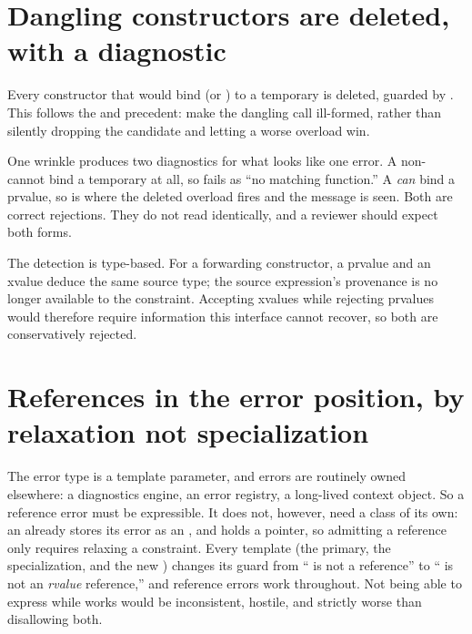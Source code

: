 \documentclass[a4paper,10pt,oneside,openany,final,article]{memoir}
\begin{document}
\section{Dangling constructors are deleted, with a diagnostic}

Every constructor that would bind  (or ) to a temporary is
deleted, guarded by 
\cite{P2255R2}. This follows the  and  precedent: make
the dangling call ill-formed, rather than silently dropping the candidate and
letting a worse overload win.

One wrinkle produces two diagnostics for what looks like one error. A non-  cannot bind a
temporary at all, so  fails as ``no matching
function.'' A  \emph{can} bind a prvalue, so
 is where the deleted overload fires and the
message is seen. Both are correct rejections. They do not read identically, and
a reviewer should expect both forms.

The detection is type-based. For a forwarding constructor, a
prvalue and an xvalue deduce the same source type; the source expression's
provenance is no longer available to the constraint. Accepting xvalues while
rejecting prvalues would therefore require information this interface cannot
recover, so both are conservatively rejected.

\section{References in the error position, by relaxation not specialization}

The error type is a template parameter, and errors are routinely owned
elsewhere: a diagnostics engine, an error registry, a long-lived context
object. So a reference error must be expressible. It does not, however, need a
class of its own: an  already stores its error as an
, and  holds a pointer, so
admitting a reference  only requires relaxing a constraint. Every  template (the primary, the
 specialization, and the new ) changes
its guard from `` is not a reference'' to `` is not an
\emph{rvalue} reference,'' and reference errors work throughout. Not being able
to express  while  works would
be inconsistent, hostile, and strictly worse than disallowing both.
\end{document}
